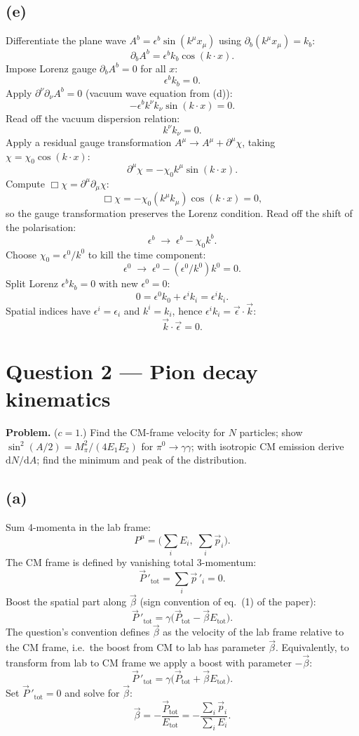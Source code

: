 \documentclass[11pt]{article}
\newcommand{\de}{\mathrm{d}}
\begin{document}
\subsection*{(e)}
Differentiate the plane wave $A^{b}=\epsilon^{b}\sin(k^{\mu}x_{\mu})$ using $\partial_{b}(k^{\mu}x_{\mu})=k_{b}$:
\[ \partial_{b}A^{b}=\epsilon^{b}k_{b}\cos(k\cdot x). \]
Impose Lorenz gauge $\partial_{b}A^{b}=0$ for all $x$:
\[ \epsilon^{b}k_{b}=0. \]
Apply $\partial^{\nu}\partial_{\nu}A^{b}=0$ (vacuum wave equation from (d)):
\[ -\epsilon^{b}k^{\nu}k_{\nu}\sin(k\cdot x)=0. \]
Read off the vacuum dispersion relation:
\[ k^{\nu}k_{\nu}=0. \]
Apply a residual gauge transformation $A^{\mu}\to A^{\mu}+\partial^{\mu}\chi$, taking $\chi=\chi_{0}\cos(k\cdot x)$:
\[ \partial^{\mu}\chi=-\chi_{0}k^{\mu}\sin(k\cdot x). \]
Compute $\Box\chi=\partial^{\mu}\partial_{\mu}\chi$:
\[ \Box\chi=-\chi_{0}(k^{\mu}k_{\mu})\cos(k\cdot x)=0, \]
so the gauge transformation preserves the Lorenz condition. Read off the shift of the polarisation:
\[ \epsilon^{b}\;\longrightarrow\;\epsilon^{b}-\chi_{0}k^{b}. \]
Choose $\chi_{0}=\epsilon^{0}/k^{0}$ to kill the time component:
\[ \epsilon^{0}\;\longrightarrow\;\epsilon^{0}-(\epsilon^{0}/k^{0})k^{0}=0. \]
Split Lorenz $\epsilon^{b}k_{b}=0$ with new $\epsilon^{0}=0$:
\[ 0=\epsilon^{0}k_{0}+\epsilon^{i}k_{i}=\epsilon^{i}k_{i}. \]
Spatial indices have $\epsilon^{i}=\epsilon_{i}$ and $k^{i}=k_{i}$, hence $\epsilon^{i}k_{i}=\vec\epsilon\cdot\vec k$:
\[ \boxed{\;\vec k\cdot\vec\epsilon=0.\;} \]

\section*{Question 2 --- Pion decay kinematics}

\textbf{Problem.} ($c=1$.) Find the CM-frame velocity for $N$ particles; show $\sin^{2}(A/2)=M_{\pi}^{2}/(4E_{1}E_{2})$ for $\pi^{0}\to\gamma\gamma$; with isotropic CM emission derive $\de N/\de A$; find the minimum and peak of the distribution.

\subsection*{(a)}
Sum 4-momenta in the lab frame:
\[ P^{\mu}=\Big(\sum_{i}E_{i},\;\sum_{i}\vec p_{i}\Big). \]
The CM frame is defined by vanishing total 3-momentum:
\[ \vec P\,'_{\mathrm{tot}}=\sum_{i}\vec p\,'_{i}=0. \]
Boost the spatial part along $\vec\beta$ (sign convention of eq.~(1) of the paper):
\[ \vec P\,'_{\mathrm{tot}}=\gamma\big(\vec P_{\mathrm{tot}}-\vec\beta E_{\mathrm{tot}}\big). \]
The question's convention defines $\vec\beta$ as the velocity of the lab frame relative to the CM frame, i.e.\ the boost from CM to lab has parameter $\vec\beta$. Equivalently, to transform from lab to CM frame we apply a boost with parameter $-\vec\beta$:
\[ \vec P\,'_{\mathrm{tot}}=\gamma\big(\vec P_{\mathrm{tot}}+\vec\beta E_{\mathrm{tot}}\big). \]
Set $\vec P\,'_{\mathrm{tot}}=0$ and solve for $\vec\beta$:
\[ \boxed{\;\vec\beta=-\frac{\vec P_{\mathrm{tot}}}{E_{\mathrm{tot}}}=-\frac{\sum_{i}\vec p_{i}}{\sum_{i}E_{i}}.\;} \]
\end{document}
